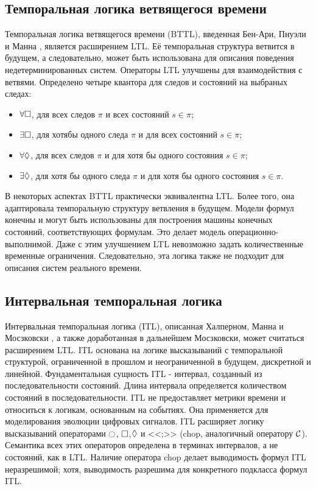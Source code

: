 		\subsection{Темпоральная логика ветвящегося времени}
			Темпоральная логика ветвящегося времени (BTTL), введенная Бен-Ари, Пнуэли и Манна \cite{BTTL}, является расширением LTL.
			Её темпоральная структура ветвится в будущем, а следовательно, может быть использована для описания поведения недетерминированных систем.
			Операторы LTL улучшены для взаимодействия с ветвями.
			Определено четыре квантора для следов и состояний на выбраных следах:
			\begin{itemize}
				\item $ \forall \square $, для всех следов $ \pi $ и всех состояний $ s \in \pi $;
				\item $ \exists \square $, для хотябы одного следа $ \pi $ и для всех состояний $ s \in \pi $;
				\item $ \forall \lozenge $, для всех следов $ \pi $ и для хотя бы одного состояния $ s \in \pi $;
				\item $ \exists \lozenge $, для хотя бы одного следа $ \pi $ и для хотя бы одного состояния $ s \in \pi $.
			\end{itemize}
			
			В некоторых аспектах BTTL практически эквивалентна LTL. Более того, она адаптировала темпоральную структуру ветвления в будущем. 
			Модели формул конечны и могут быть использованы для построения машины конечных состояний, соответствующих формулам.
			Это делает модель операционно-выполнимой.
			Даже с этим улучшением LTL невозможно задать количественные временные ограничения. 
			Следовательно, эта логика также не подходит для описания систем реального времени.
		
		\subsection{Интервальная темпоральная логика}
		 Интервальная темпоральная логика (ITL), описанная Халперном, Манна и Мосзковски \cite{ITL}, а также доработанная в дальнейшем Мосзковски, может считаться расширением LTL. 
		 ITL основана на логике высказываний с темпоральной структурой, ограниченной в прошлом и неограниченной в будущем, дискретной и линейной.
		 Фундаментальная сущность ITL - интервал, созданный из последовательности состояний.
		 Длина интервала определяется количеством состояний в последовательности.
		 ITL не предоставляет метрики времени и относиться к логикам, основанным на событиях.
		 Она применяется для моделирования эволюции цифровых сигналов.
		 ITL расширяет логику высказываний операторами $ \Next $, $ \square $,$ \lozenge $ и <<;>> (chop, аналогичный оператору $ \mathcal{C} $).
		 Семантика всех этих операторов определена в терминах интервалов, а не состояний, как в LTL.
		 Наличие оператора chop делает выводимость формул ITL неразрешимой; хотя, выводимость разрешима для конкретного подкласса формул ITL.
		 

